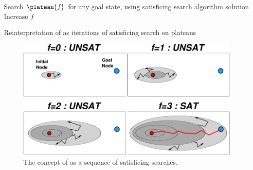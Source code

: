 \begin{algorithm}
 \begin{algorithmic}
  \LOOP
  \STATE Search $\plateau{f}$ for any goal state, using satisficing search algorithm
  \RETURN solution
  \ELSE
  \STATE Increase $f$ 
  \ENDIF
  \ENDLOOP
 \end{algorithmic}
 \caption{Reinterpretation of \astar as iterations of satisficing search on plateaus}
 \label{alg:astar-sat}
\end{algorithm}

\begin{figure}[htbp]
 \centering
 \includegraphics[width=0.8\linewidth]{img/astar/plateau-5.pdf}
 \caption{The concept of \astar as a sequence of satisficing searches.}
 \label{fig:astar-sat}
\end{figure}


